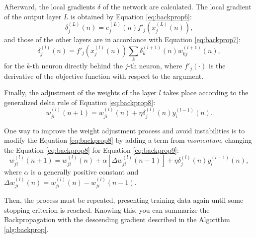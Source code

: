 \documentclass[ruled,graybox]{svmult}
\begin{document}
Afterward, the local gradients $\delta$ of the network are calculated. The local gradient of the output layer $L$ is obtained by Equation \ref{eq:backprop6}:
\begin{equation}
    \label{eq:backprop6}
    \delta_j^{(L)} (n) = e_j^{(L)}(n) {f}'_j (x_j^{(L)}(n)),
\end{equation}
and those of the other layers are in accordance with Equation \ref{eq:backprop7}:
\begin{equation}
    \label{eq:backprop7}
    \delta_j^{(l)} (n) = {f}'_j (x_j^{(l)}(n)) \sum_k \delta_k^{(l+1)} (n) w_{kj}^{(l+1)}(n),
\end{equation}
for the $k$-th neuron directly behind the $j$-th neuron, where ${f}'_j(\cdot)$ is the derivative of the objective function with respect to the argument.

Finally, the adjustment of the weights of the layer $l$ takes place according to the generalized delta rule of Equation \ref{eq:backprop8}:
\begin{equation}
    \label{eq:backprop8}
    w_{ji}^{(l)} (n+1) = w_{ji}^{(l)}(n) + \eta \delta_j^{(l)}(n) y_i^{(l-1)} (n).
\end{equation}

One way to improve the weight adjustment process and avoid instabilities is to modify the Equation \ref{eq:backprop8} by adding a term from \textit{momentum}, changing the Equation \ref{eq:backprop8} for Equation \ref{eq:backprop9}:
\begin{equation}
\label{eq:backprop9}
    w_{ji}^{(l)} (n+1) = w_{ji}^{(l)}(n) + \alpha[\Delta w_{ji}^{(l)}(n-1)] + \eta \delta_j^{(l)}(n) y_i^{(l-1)} (n),
\end{equation}
where $\alpha$ is a generally positive constant and $\Delta w_{ji}^{(l)}(n) = w_{ji}^{(l)}(n) - w_{ji}^{(l)}(n-1)$.


Then, the process must be repeated, presenting training data again until some stopping criterion is reached. Knowing this, you can summarize the Backpropagation with the descending gradient described in the Algorithm \ref{alg:backprop}.


\end{document}
